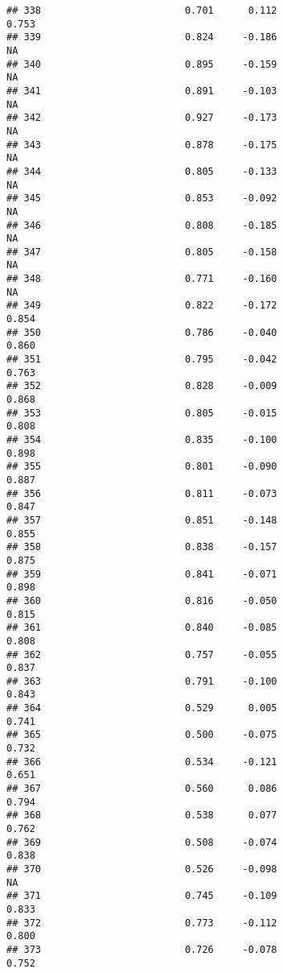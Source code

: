 \documentclass[
]{article}
\begin{document}
\begin{verbatim}
## 338                         0.701      0.112                     0.753
## 339                         0.824     -0.186                        NA
## 340                         0.895     -0.159                        NA
## 341                         0.891     -0.103                        NA
## 342                         0.927     -0.173                        NA
## 343                         0.878     -0.175                        NA
## 344                         0.805     -0.133                        NA
## 345                         0.853     -0.092                        NA
## 346                         0.808     -0.185                        NA
## 347                         0.805     -0.158                        NA
## 348                         0.771     -0.160                        NA
## 349                         0.822     -0.172                     0.854
## 350                         0.786     -0.040                     0.860
## 351                         0.795     -0.042                     0.763
## 352                         0.828     -0.009                     0.868
## 353                         0.805     -0.015                     0.808
## 354                         0.835     -0.100                     0.898
## 355                         0.801     -0.090                     0.887
## 356                         0.811     -0.073                     0.847
## 357                         0.851     -0.148                     0.855
## 358                         0.838     -0.157                     0.875
## 359                         0.841     -0.071                     0.898
## 360                         0.816     -0.050                     0.815
## 361                         0.840     -0.085                     0.808
## 362                         0.757     -0.055                     0.837
## 363                         0.791     -0.100                     0.843
## 364                         0.529      0.005                     0.741
## 365                         0.500     -0.075                     0.732
## 366                         0.534     -0.121                     0.651
## 367                         0.560      0.086                     0.794
## 368                         0.538      0.077                     0.762
## 369                         0.508     -0.074                     0.838
## 370                         0.526     -0.098                        NA
## 371                         0.745     -0.109                     0.833
## 372                         0.773     -0.112                     0.800
## 373                         0.726     -0.078                     0.752

\end{verbatim}
\end{document}

